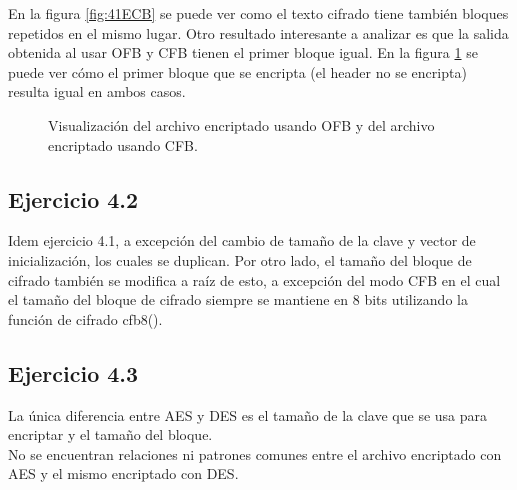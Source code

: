 \documentclass[a4paper,10pt]{article}
\begin{document}
En la figura \ref{fig:41ECB} se puede ver como el texto cifrado tiene tambi\'en bloques
repetidos en el mismo lugar. Otro resultado interesante a analizar es que la salida obtenida al usar
OFB y CFB tienen el primer bloque igual. En la figura \ref{fig:41OFBCFB} se puede ver
c\'omo el primer bloque que se encripta (el header no se encripta) resulta igual en ambos casos.
\begin{figure}
	\begin{center}
	\end{center}
	\caption{Visualización del archivo encriptado usando OFB y del archivo encriptado usando CFB.}
	\label{fig:41OFBCFB}
\end{figure}

\subsection{Ejercicio 4.2}
Idem ejercicio 4.1, a excepci\'on del cambio de tama\~no de la clave y vector de inicializaci\'on, los cuales se duplican. Por otro lado, el tama\~no del bloque de cifrado tambi\'en se modifica a ra\'iz de esto, a excepci\'on del modo CFB en el cual el tama\~no del bloque de cifrado siempre se mantiene en 8 bits utilizando la funci\'on de cifrado cfb8().

\subsection{Ejercicio 4.3}
La \'unica diferencia entre AES y DES es el tama\~no de la clave que se usa para encriptar y el tama\~no del bloque.\\
No se encuentran relaciones ni patrones comunes entre el archivo encriptado con AES y el mismo encriptado con DES.\\
\end{document}
